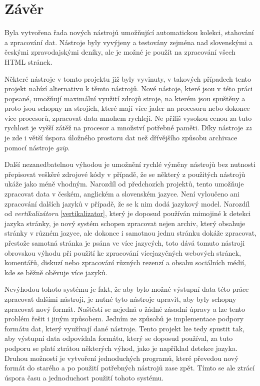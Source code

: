 \chapter{Závěr}
Byla vytvořena řada nových nástrojů umožňující automatickou kolekci, stahování a
zpracování dat. Nástroje byly vyvýjeny a testovány zejména nad slovenskými a
českými zpravodajskými deníky, ale je možné je použít na zpracování
všech HTML stránek.

Některé nástroje v tomto projektu již byly vyvinuty, v takových případech tento projekt
nabízí alternativu k těmto nástrojů. Nové nástoje, které jsou v této práci popsané,
umožňují maximální využití zdrojů stroje, na kterém jsou spuštěny a proto jsou
schopny na strojích, které mají více jader na procesoru nebo dokonce více procesorů,
zpracovat data mnohem rychleji. Ne příliš vysokou cenou za tuto rychlost je vyšší
zátěž na procesor a množství potřebné paměti. Díky nástroje \textit{xz} je
zde i větší úspora úložného prostoru dat než dřívějšího způsobu archivace pomocí
nástroje \textit{gzip}.

Další nezanedbatelnou výhodou je umožnění rychlé výměny nástrojů bez nutnosti přepisovat veškěré
zdrojové kódy v případě, že se některý z použitých nástrojů ukáže jako méně vhodným.
Narozdíl od předchozích projektů, tento umožňuje zpracovat data v českém, anglickém a
slovenském jazyce. Není vyloučeno ani zpracování dalších jazyků v případě, že se
k nim dodá jazykový model. Narozdíl od \textit{vertikalizátoru} \ref{vertikalizator},
který je doposud používán mimojiné k detekci jazyka stránky, je nový systém schopen zpracovat
nejen archiv, který obsahuje stránky v různém jazyce, ale dokonce i samotnou jednu stránku
dokáže zpracovat, přestože samotná stránka je psána ve více jazycých, toto dává
tomuto nástroji obrovskou výhodu při použití ke zpracování vícejazyčných webových stránek,
komentářů, diskuzí nebo zpracování různých rezenzí a obsahu sociálních médií, kde se běžně
oběvuje více jazyků.

Nevýhodou tohoto systému je fakt, že aby bylo možné výstupní data této práce zpracovat dalšími
nástroji, je nutné tyto nástroje upravit, aby byly schopny zpracovat nový formát. Naštěstí
se nejedná o žádné zásadní úpravy a lze tento problém řešit i jiným způsobem. Jedním ze
způsobů je implementace podpory formátu dat, který využívají dané nástroje. Tento projekt
lze tedy spustit tak, aby výstupní data odpovídala formátu, který se doposud používal,
za tuto podporu se platí ztrátou některých výhod, jako je například detekce
jazyka. Druhou možností je vytvoření jednoduchých programů, které převedou nový formát
do starého a po použití potřebných nástrojů zase zpět. Tímto se ale ztrácí úspora času
a jednoduchost použití tohoto systému.
